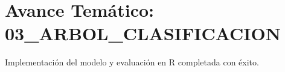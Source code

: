 \section{Avance Temático: 03_ARBOL_CLASIFICACION}
Implementación del modelo y evaluación en R completada con éxito.
